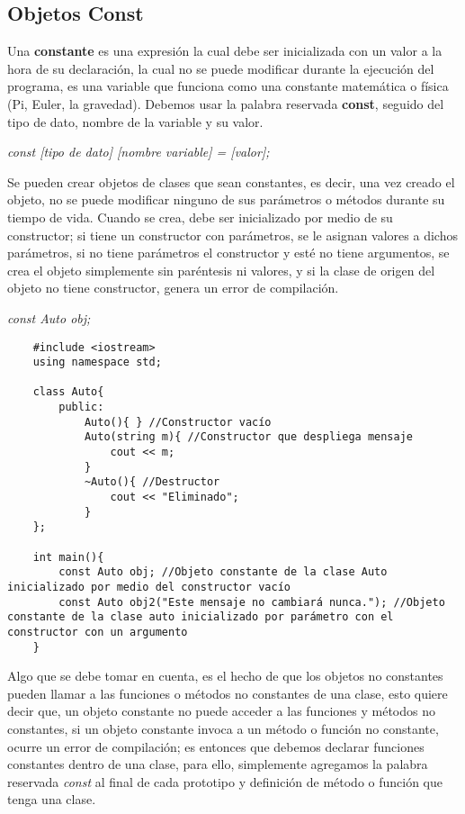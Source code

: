 \subsection{Objetos Const}
Una \textbf{constante} es una expresión la cual debe ser inicializada con un valor a la hora de su declaración, la cual no se puede modificar durante la ejecución del programa, es una variable que funciona como una constante matemática o física (Pi, Euler, la gravedad). Debemos usar la palabra reservada \textbf{const}, seguido del tipo de dato, nombre de la variable y su valor.\begin{center}\textit{const [tipo de dato] [nombre variable] = [valor];}\end{center}
Se pueden crear objetos de clases que sean constantes, es decir, una vez creado el objeto, no se puede modificar ninguno de sus parámetros o métodos durante su tiempo de vida. Cuando se crea, debe ser inicializado por medio de su constructor; si tiene un constructor con parámetros, se le asignan valores a dichos parámetros, si no tiene parámetros el constructor y esté no tiene argumentos, se crea el objeto simplemente sin paréntesis ni valores, y si la clase de origen del objeto no tiene constructor, genera un error de compilación.\begin{center}\textit{const Auto obj;}\end{center}
\begin{lstlisting}
    #include <iostream>
    using namespace std;
    
    class Auto{
        public:
            Auto(){ } //Constructor vacío
            Auto(string m){ //Constructor que despliega mensaje
                cout << m;
            }
            ~Auto(){ //Destructor
                cout << "Eliminado";
            }
    };
    
    int main(){
        const Auto obj; //Objeto constante de la clase Auto inicializado por medio del constructor vacío
        const Auto obj2("Este mensaje no cambiará nunca."); //Objeto constante de la clase auto inicializado por parámetro con el constructor con un argumento
    }
\end{lstlisting}
Algo que se debe tomar en cuenta, es el hecho de que los objetos no constantes pueden llamar a las funciones o métodos no constantes de una clase, esto quiere decir que, un objeto constante no puede acceder a las funciones y métodos no constantes, si un objeto constante invoca a un método o función no constante, ocurre un error de compilación; es entonces que debemos declarar funciones constantes dentro de una clase, para ello, simplemente agregamos la palabra reservada \textit{const} al final de cada prototipo y definición de método o función que tenga una clase.
